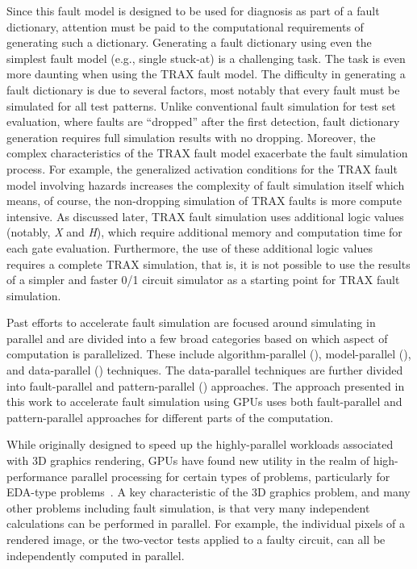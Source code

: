 Since this fault model is designed to be used for diagnosis as part of a fault dictionary, attention must be paid to the computational requirements of generating such a dictionary.
%
Generating a fault dictionary using even the simplest fault model (e.g., single stuck-at) is a challenging task.
%
The task is even more daunting when using the TRAX fault model.
%
The difficulty in generating a fault dictionary is due to several factors, most notably that every fault must be simulated for all test patterns.
%
Unlike conventional fault simulation for test set evaluation, where faults are ``dropped'' after the first detection, fault dictionary generation requires full simulation results with no dropping.
%
Moreover, the complex characteristics of the TRAX fault model exacerbate the fault simulation process.
%
For example, the generalized activation conditions for the TRAX fault model involving hazards increases the complexity of fault simulation itself which means, of course, the non-dropping simulation of TRAX faults is more compute intensive.
%
As discussed later, TRAX fault simulation uses additional logic values (notably, \textit{X} and \textit{H}), which require additional memory and computation time for each gate evaluation.
%
Furthermore, the use of these additional logic values requires a complete TRAX simulation, that is, it is not possible to use the results of a simpler and faster 0/1 circuit simulator as a starting point for TRAX fault simulation.

Past efforts to accelerate fault simulation are focused around simulating in parallel and are divided into a few broad categories based on which aspect of computation is parallelized.
%
These include algorithm-parallel (\cite{agrawal87, amin97}), model-parallel (\cite{tai93, narayanan92}), and data-parallel (\cite{beece88, ozguner88, pfister82}) techniques.
%
The data-parallel techniques are further divided into fault-parallel and pattern-parallel (\cite{gulati09, parkes95, lee91}) approaches.
%
The approach presented in this work to accelerate fault simulation using GPUs uses both fault-parallel and pattern-parallel approaches for different parts of the computation.

While originally designed to speed up the highly-parallel workloads associated with 3D graphics rendering, GPUs have found new utility in the realm of high-performance parallel processing for certain types of problems, particularly for EDA-type problems~\cite{croix09}.
%
A key characteristic of the 3D graphics problem, and many other problems including fault simulation, is that very many independent calculations can be performed in parallel.
%
For example, the individual pixels of a rendered image, or the two-vector tests applied to a faulty circuit, can all be independently computed in parallel.

